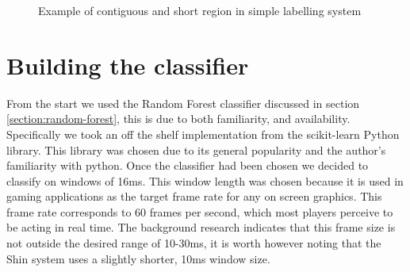 \documentclass[ %
                    author={Sam Phippen},
                supervisor={Dr. Rafal Bogacz},
                     title={Real time voice activity detectors in noisy personal computing environments},
                  subtitle={},
                    degree={MEng},
                      year={2012} ]{thesis}
\begin{document}
\begin{figure}
    \label{img:labelling_example}
    \caption{Example of contiguous and short region in simple labelling system}
\end{figure}

\section{Building the classifier}

From the start we used the Random Forest classifier discussed in section
\ref{section:random-forest}, this is due to both familiarity, and availability.
Specifically we took an off the shelf implementation from the
scikit-learn\cite{sklearn} Python library. This library was chosen due to its
general popularity and the author's familiarity with python. Once the
classifier had been chosen we decided to classify on windows of 16ms. This
window length was chosen because it is used in gaming applications as the
target frame rate for any on screen graphics. This frame rate corresponds to 60
frames per second, which most players perceive to be acting in real time. The
background research indicates that this frame size is not outside the desired
range of 10-30ms, it is worth however noting that the Shin\cite{shin} system
uses a slightly shorter, 10ms window size.
\end{document}
